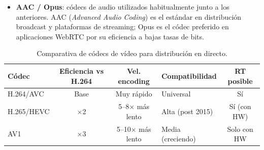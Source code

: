 \begin{itemize}
  \item \textbf{AAC / Opus}: códecs de audio utilizados habitualmente junto a los
  anteriores. AAC (\textit{Advanced Audio Coding}) es el estándar en distribución
  broadcast y plataformas de streaming; Opus es el códec preferido en aplicaciones
  WebRTC por su eficiencia a bajas tasas de bits.
\end{itemize}

\begin{table}[H]
  \centering
  \caption{Comparativa de códecs de vídeo para distribución en directo.}
  \label{tab:codecs_distribucion}
  \small
  \begin{tabularx}{\linewidth}{|l|c|c|X|c|}
    \hline
    \textbf{Códec} & \textbf{Eficiencia vs H.264} & \textbf{Vel. encoding} & \textbf{Compatibilidad} & \textbf{RT posible} \\
    \hline
    H.264/AVC  & Base       & Muy rápido       & Universal         & Sí \\
    H.265/HEVC & $\times$2  & 5--8$\times$ más lento & Alta (post 2015) & Sí (con HW) \\
    AV1        & $\times$3  & 5--10$\times$ más lento & Media (creciendo) & Solo con HW \\
    \hline
  \end{tabularx}
\end{table}
